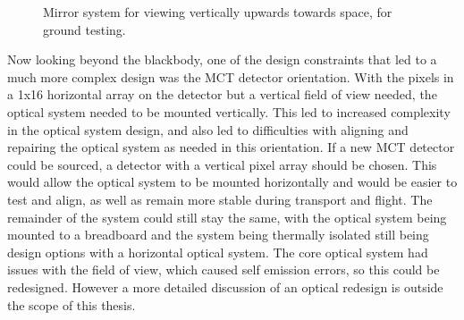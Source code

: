 \begin{figure}
    \centering
    \caption{Mirror system for viewing vertically upwards towards space, for ground testing.}
    \label{fig:deepspace_mirror}
\end{figure}

Now looking beyond the blackbody, one of the design constraints that led to a much more complex design was the MCT detector orientation. With the pixels in a 1x16 horizontal array on the detector but a vertical field of view needed, the optical system needed to be mounted vertically. This led to increased complexity in the optical system design, and also led to difficulties with aligning and repairing the optical system as needed in this orientation. If a new MCT detector could be sourced, a detector with a vertical pixel array should be chosen. This would allow the optical system to be mounted horizontally and would be easier to test and align, as well as remain more stable during transport and flight. The remainder of the system could still stay the same, with the optical system being mounted to a breadboard and the system being thermally isolated still being design options with a horizontal optical system. The core optical system had issues with the field of view, which caused self emission errors, so this could be redesigned. However a more detailed discussion of an optical redesign is outside the scope of this thesis.


